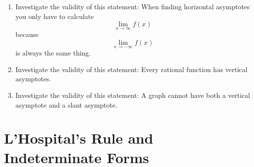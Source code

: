 \begin{enumerate}
\item  Investigate the validity of this statement: When finding horizontal asymptotes you only have to calculate $$\mathop {\lim }\limits_{x \to \infty } f(x)$$ because $$\mathop {\lim }\limits_{x \to  - \infty } f(x)$$ is always the same thing. 

\item  Investigate the validity of this statement:  Every rational function has vertical asymptotes.

\item  Investigate the validity of this statement:  A graph cannot have both a vertical asymptote and a slant asymptote.

\end{enumerate}\section{L'Hospital's Rule and Indeterminate Forms}

